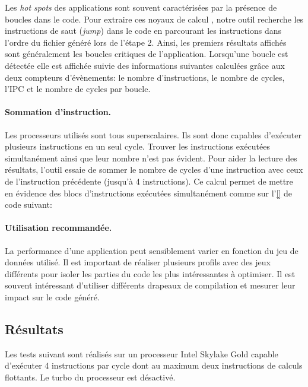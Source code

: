         Les \textit{hot spots} des applications sont souvent caractérisées par la présence de boucles dans le code. Pour extraire ces noyaux de calcul , notre outil recherche les instructions de saut (\textit{jump}) dans le code en parcourant les instructions dans l'ordre du fichier généré lors de l'étape 2. Ainsi, les premiers résultats affichés sont généralement les boucles critiques de l'application. Lorsqu'une boucle est détectée elle est affichée suivie des informations suivantes calculées grâce aux deux compteurs d'évènements: le nombre d'instructions, le nombre de cycles, l'IPC et le nombre de cycles par boucle. 
        
        \paragraph{Sommation d'instruction.} Les processeurs utilisés sont tous superscalaires. Ils sont donc capables d'exécuter plusieurs instructions en un seul cycle. Trouver les instructions exécutées simultanément ainsi que leur nombre n'est pas évident. Pour aider la lecture des résultats, l'outil essaie de sommer le nombre de cycles d'une instruction avec ceux de l'instruction précédente (jusqu'à 4 instructions). Ce calcul permet de mettre en évidence des blocs d'instructions exécutées simultanément comme sur l'\autoref{} de code suivant:
        
        \paragraph{Utilisation recommandée.} La performance d'une application peut sensiblement varier en fonction du jeu de données utilisé. Il est important de réaliser plusieurs profils avec des jeux différents pour isoler les parties du code les plus intéressantes à optimiser. Il est souvent intéressant d'utiliser différents drapeaux de compilation et mesurer leur impact sur le code généré. 
        

\subsection{Résultats}

    Les tests suivant sont réalisés sur un processeur Intel Skylake Gold capable d'exécuter 4 instructions par cycle dont au maximum deux instructions de calculs flottants. Le turbo du processeur est désactivé. 


